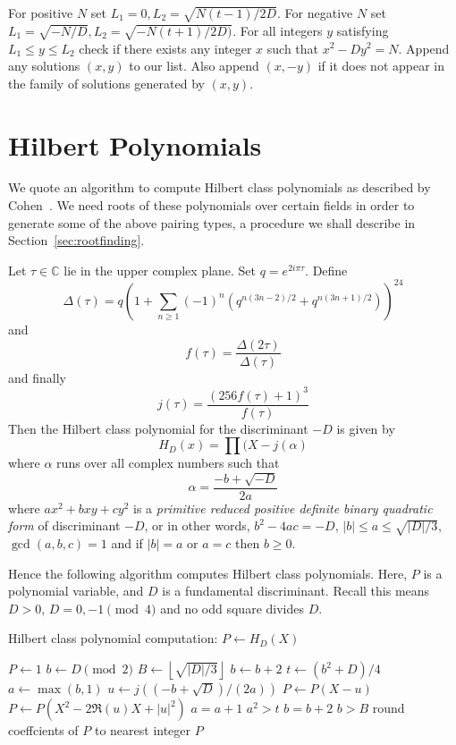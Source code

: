 For positive $N$ set $L_1=0, L_2 =\sqrt{N(t-1)/2D}$. For negative $N$
set $L_1 = \sqrt{-N/D}, L_2=\sqrt{-N(t+1)/2D)}$. For all integers $y$
satisfying $L_1\le y \le L_2$ check if there exists any integer $x$ such that
$x^2 - Dy^2 = N$.
Append any solutions $(x,y)$ to our list. Also append $(x,-y)$ if
it does not appear in the family of solutions generated by $(x, y)$.

\section {\label{sec:hilbertpoly}Hilbert Polynomials}

We quote an algorithm to compute Hilbert class
polynomials as described by Cohen~\cite[section 7.6.2]{1993-cohen}.
We need roots of these polynomials over certain fields in order to generate
some of the above pairing types, a procedure we shall describe in
Section~\ref{sec:rootfinding}.

Let $\tau \in \mathbb{C}$ lie in the upper complex plane.
Set $q = e^{2 i \pi \tau}$. Define
\[
\Delta(\tau) = q\left(1+\sum_{n\ge1}(-1)^n
\left({q^{n(3n-2)/2} + q^{n(3n+1)/2}}\right)\right)^{24}
\]
and
\[
f(\tau) = \frac{\Delta(2\tau)}{\Delta(\tau)}
\]
and finally
\[
j(\tau) = \frac{(256 f(\tau) + 1)^3}{f(\tau)}
\]
Then the Hilbert class polynomial for the discriminant $-D$ is
given by
\[ H_D(x) = \prod (X - j(\alpha) \]
where $\alpha$ runs over all complex numbers such that
\[ \alpha = \frac{-b+\sqrt{-D}}{2a} \]
where $ax^2 + bxy + cy^2$ is a \emph{primitive reduced positive definite
binary quadratic form} of discriminant $-D$, or in other words,
$b^2 - 4ac = -D$, $|b| \le a \le \sqrt{|D|/3}$, $\gcd(a,b,c)=1$ and
if $|b| = a$ or $a=c$ then $b\ge0$.

Hence the following algorithm computes Hilbert class polynomials.
Here, $P$ is a polynomial variable, and $D$ is a fundamental discriminant.
Recall this means $D > 0$, $D = 0, -1 \pmod 4$ and no odd square divides $D$.

\begin{algorithm}
\caption {Hilbert class polynomial computation: $P \gets H_D(X)$}
\begin{algorithmic}[1]
\STATE $P\gets 1$
\STATE $b\gets D \pmod 2$
\STATE $B\gets \left\lfloor\sqrt{|D|/3}\right\rfloor$
\REPEAT
    \STATE $b\gets b+2$
    \STATE $t\gets (b^2+D)/4$
    \STATE $a\gets \max(b,1)$
    \REPEAT
	    \STATE $u\gets j((-b+\sqrt{D})/(2a))$
		\STATE $P \gets P(X-u)$
	    \ELSE
		\STATE $P \gets P(X^2 - 2\Re(u)X+|u|^2)$
	    \ENDIF
	\ENDIF
	\STATE $a=a+1$
    \UNTIL $a^2>t$
    \STATE $b=b+2$
\UNTIL $b>B$
\STATE round coeffcients of $P$ to nearest integer
\RETURN $P$
\end{algorithmic}
\end{algorithm}

